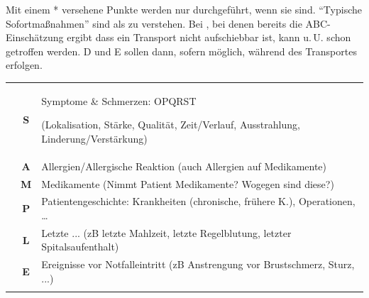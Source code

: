 \documentclass[
ngerman,
paper=a4,
asymmetric,
fontsize=9pt,
draft=false,
openany,
numbers=noenddot,
bibtotocnumbered,
footnotes=multiple,
toc=flat,
]{scrbook}
\begin{document}
{\begin{minipage}[t]{\linewidth -
{2\fboxrule} - {2\fboxsep}}
\begin{minipage}[t]{\linewidth}
{\begin{center}
{\tiny Mit einem * versehene Punkte werden nur durchgeführt,
wenn sie  sind. \enquote{Typische
Sofortmaßnahmen} sind als  zu verstehen.
Bei , bei denen bereits die 
ABC-Einschätzung ergibt dass ein Transport nicht aufschiebbar ist, 
kann u.\,U. schon  getroffen werden. 
D und E sollen dann, sofern möglich, während des 
Transportes erfolgen. }
\end{center}
}
\end{minipage}
\end{minipage}\vspace{-\baselineskip}
}

\vfill
\restoregeometry\pagestyle{fancy}

{}
{}
{%
\begin{minipage}{\linewidth}
\FontTableBase\footnotesize
{\sffamily\FontTableBase\footnotesize\CorrectionItemizeBox\renewcommand{\itemhook}{%
  \setlength{\itemsep}{0.005\baselineskip}
  \setlength{\leftmargin}{1.4em}
  \setlength{\labelwidth}{0.9em}
}
\begin{tabulary}{\linewidth}[H]{lCL}
\toprule\addlinespace
{}
 &
{\sffamily\textbf S}
 &
Symptome {\&} Schmerzen: OPQRST

{\tiny(Lokalisation, Stärke,  Qualität, Zeit/Verlauf, 
 Ausstrahlung, Linderung/Verstärkung)}
\\\addlinespace
 &
{\sffamily\textbf A}
 &
Allergien/Allergische Reaktion (auch
Allergien auf Medikamente)
\\\addlinespace
 &
 {\sffamily\textbf M}
 &
Medikamente {\tiny(Nimmt Patient Medikamente?
Wogegen sind diese?)}
\\\addlinespace
 &
{\sffamily\textbf P}
 &
Patientengeschichte: Krankheiten {\tiny(chronische, frühere
K.)}, Operationen, \ldots 
\\\addlinespace
 &
 {\sffamily\textbf L}
 &
Letzte ... (zB letzte Mahlzeit, letzte
Regelblutung, letzter Spitalsaufenthalt)
\\\addlinespace
 &
 {\sffamily\textbf E}
 &
Ereignisse vor Notfalleintritt {\tiny(zB
Anstrengung vor Brustschmerz, Sturz, ...)}
\\\addlinespace\midrule\addlinespace


\end{tabulary}}
\end{minipage}}
\end{document}
